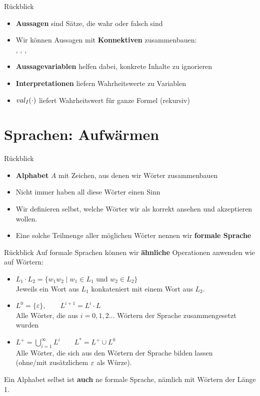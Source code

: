 \framePrevEpisode

\begin{frame}{Rückblick}
	\begin{itemize}
		\item \textbf{Aussagen} sind Sätze, die wahr oder falsch sind
		\item Wir können Aussagen mit \textbf{Konnektiven} zusammenbauen: \\
		\bund, \boder, \bnot, \bimp
		\item \textbf{Aussagevariablen} helfen dabei, konkrete Inhalte zu ignorieren 
		\item \textbf{Interpretationen} liefern Wahrheitswerte zu Variablen
		\item $val_I(\cdot)$ liefert Wahrheitswert für ganze Formel (rekursiv)
	\end{itemize}
\end{frame}






\section{Sprachen: Aufwärmen}


\begin{frame}{Rückblick}
	\begin{itemize}
		\item \textbf{Alphabet} $A$ mit Zeichen, aus denen wir Wörter zusammenbauen
		\item Nicht immer haben all diese Wörter einen Sinn
		\item Wir definieren selbst, welche Wörter wir als korrekt ansehen und akzeptieren wollen.
		\item Eine solche Teilmenge aller möglichen Wörter nennen wir \textbf{formale Sprache}
	\end{itemize}
\end{frame}

\begin{frame}{Rückblick}
	Auf formale Sprachen können wir \textbf{ähnliche} Operationen anwenden wie auf Wörtern:
	\begin{itemize}
		\item $L_1 \cdot L_2 = \{w_1 w_2 \mid w_1 \in L_1 \text{ und } w_2 \in L_2 \}$\\
		Jeweils ein Wort aus $L_1$ konkateniert mit einem Wort aus $L_2$.
		\pause
		\item $L^0 = \{\varepsilon \}, \qquad L^{i+1} = L^i \cdot L$\\
		Alle Wörter, die aus $i = 0,1,2...$ Wörtern der Sprache zusammengesetzt wurden
		\pause
		\item $L^+ = \bigcup \limits_{i=1}^\infty L^i \qquad L^* = L^+ \cup L^0$\\
		Alle Wörter, die sich aus den Wörtern der Sprache bilden lassen \\ 
		(ohne/mit zusätzlichem $\varepsilon$ als Würze).
	\end{itemize}
	Ein Alphabet selbst ist \textbf{auch} ne formale Sprache, nämlich mit Wörtern der Länge 1.
\end{frame}

